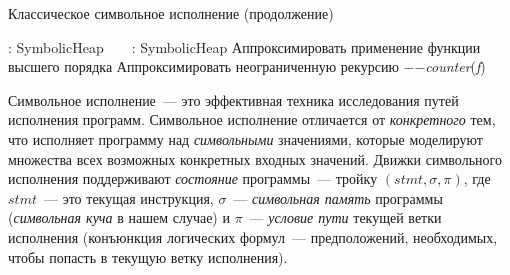 {\begin{algorithm}
\begin{algorithmic}[1]
			\EndCase
				\State {}
				\State {}\label{algo:line:heap-manipulation-end}
			\EndCase
				\State {}
				\State {}
			\EndCase
	\EndSwitch
	\EndFunction
\end{algorithmic}
\end{algorithm}
\begin{algorithm}[t]
\caption{Классическое символьное исполнение (продолжение)}
\begin{algorithmic}[1]
	 : SymbolicHeap
		\label{algo:line:then-branch-begin}
			 \State {}
		\Else~\EndIf
			\State {}
		\Else~\EndIf\label{algo:line:else-branch-end}
		\State \Return {}\label{algo:line:merge}
	\EndFunction
	 : SymbolicHeap\label{algo:line:call-func-begin}
			\State Аппроксимировать применение функции высшего порядка
		\EndIf
			\State Аппроксимировать неограниченную рекурсию
		\EndIf
		\State {}
		\State $-$$-$\emph{counter}(\emph{f})
		\State {}
	\EndFunction\label{algo:line:call-func-end}
\end{algorithmic}
\end{algorithm}
}

Символьное исполнение~--- это эффективная техника исследования путей исполнения программ. Символьное исполнение отличается от \emph{конкретного} тем, что исполняет программу над \emph{символьными} значениями, которые моделируют множества всех возможных конкретных входных значений. Движки символьного исполнения поддерживают \emph{состояние} программы~--- тройку $(stmt, \sigma, \pi)$, где $stmt$~--- это текущая инструкция, $\sigma$~--- \emph{символьная память} программы (\emph{символьная куча} в нашем случае) и $\pi$~--- \emph{условие пути} текущей ветки исполнения (конъюнкция логических формул~--- предположений, необходимых, чтобы попасть в текущую ветку исполнения).

